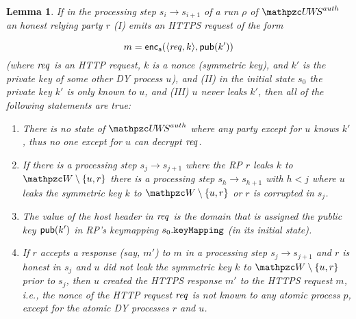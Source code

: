 \documentclass[letterpaper,onecolumn,10pt]{article}
\newtheorem{lemma}{Lemma}
\begin{document}
\begin{lemma}\label{lemma:k-does-not-leak-from-honest-rp} 
  If in the processing step $s_i \rightarrow s_{i+1}$ of a run $\rho$
  of $\uppressoauthwebsystem$ an honest relying party $r$ (I) emits an HTTPS
  request of the form

  \[ m = \mathsf{enc}_\mathsf{a}(\langle\mathit{req}, k\rangle,\mathsf{pub}(k')) \]
%
  (where $\mathit{req}$ is an HTTP request, $k$ is a nonce (symmetric
  key), and $k'$ is the private key of some other DY process $u$), and (II) in the
  initial state $s_0$ the private key $k'$ is only known to $u$, and
  (III) $u$ never leaks $k'$, then all of the following
  statements are true:
  \begin{enumerate}
  \item There is no state of $\uppressoauthwebsystem$ where any party except
    for $u$ knows $k'$, thus no one except for $u$ can
    decrypt $\mathit{req}$.
    \label{prop:attacker-cannot-decrypt-spresso}
  \item If there is a processing step $s_j \rightarrow s_{j+1}$ where
    the RP $r$ leaks $k$ to $\bidsystem \setminus \{u, r\}$ there
    is a processing step $s_h \rightarrow s_{h+1}$ with $h < j$
    where $u$ leaks the symmetric key $k$ to $\bidsystem \setminus
    \{u,r\}$ or $r$ is corrupted in
    $s_j$. \label{prop:k-doesnt-leak-spresso}
  \item The value of the host header in $\mathit{req}$ is the domain that
    is assigned the public key $\mathsf{pub}(k')$ in RP's keymapping
    $s_0.\mathtt{keyMapping}$ (in its initial
    state). \label{prop:host-header-matches-spresso}
  \item If $r$ accepts a response (say, $m'$) to $m$ in a processing step $s_j
    \rightarrow s_{j+1}$ and $r$ is honest in $s_j$ and $u$ did not
    leak the symmetric key $k$ to $\bidsystem \setminus \{u,r\}$ prior
    to $s_j$, then $u$ created the HTTPS response $m'$ to the HTTPS
    request $m$, i.e., the nonce of the HTTP request $\mathit{req}$ is not known to
    any atomic process $p$, except for the atomic DY processes $r$ and
    $u$.\label{prop:only-owner-answers-spresso}
  \end{enumerate}
\end{lemma}

\end{document}
